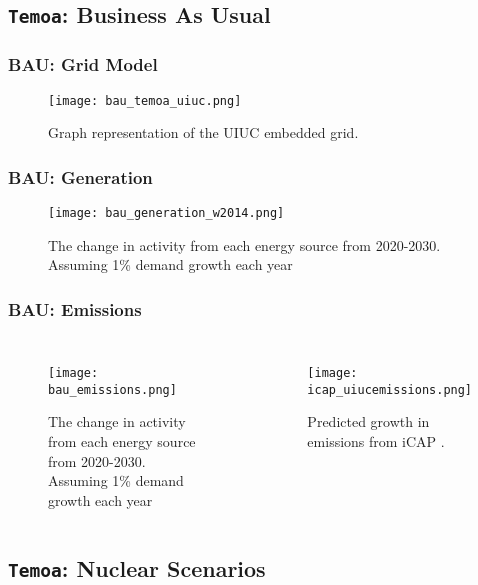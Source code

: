 \subsection{\texttt{Temoa}: Business As Usual}
\begin{frame}
  \frametitle{BAU: Grid Model}
  \begin{figure}
    \texttt{[image: bau\_temoa\_uiuc.png]}
    \caption{Graph representation of the UIUC embedded grid.}
    \label{fig:uiucgrid}
  \end{figure}
\end{frame}

\begin{frame}
  \frametitle{BAU: Generation}
      \begin{figure}
        \texttt{[image: bau\_generation\_w2014.png]}
        \caption{The change in activity from each energy source from 2020-2030. Assuming 1\% demand growth each year}
        \label{fig:bau_generation}
      \end{figure}

\end{frame}

\begin{frame}
  \frametitle{BAU: Emissions}
  \begin{columns}
    \column[t]{5cm}
      \begin{figure}
        \texttt{[image: bau\_emissions.png]}
        \caption{The change in activity from each energy source from 2020-2030. Assuming 1\% demand growth each year}
        \label{fig:bau_generation}
      \end{figure}
    \column[t]{5cm}
    \begin{figure}
        \texttt{[image: icap\_uiucemissions.png]}
        \caption{Predicted growth in emissions from iCAP \cite{isee_illinois_2015}.}
        \label{fig:uiuc_emissions}
      \end{figure}
  \end{columns}
\end{frame}

\subsection{\texttt{Temoa}: Nuclear Scenarios}

